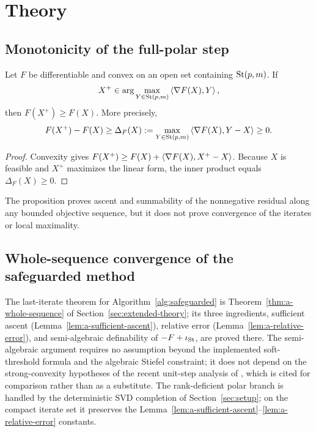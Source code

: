 \section{Theory}
\label{sec:theory}



\subsection{Monotonicity of the full-polar step}
\begin{proposition}
\label{prop:fullpolar-monotone}
Let \(F\) be differentiable and convex on an open set containing \(\mathrm{St}(p,m)\). If
\[
X^+\in\arg\max_{Y\in\mathrm{St}(p,m)}\left\langle \nabla F(X),Y\right\rangle,
\]
then \(F(X^+)\ge F(X)\). More precisely,
\[
F(X^+)-F(X)\ge \Delta_F(X):=
\max_{Y\in\mathrm{St}(p,m)}\left\langle \nabla F(X),Y-X\right\rangle\ge0.
\]
\end{proposition}
\begin{proof}
Convexity gives \(F(X^+)\ge F(X)+\left\langle \nabla F(X),X^+-X\right\rangle\). Because \(X\) is feasible and \(X^+\) maximizes the linear form, the inner product equals \(\Delta_F(X)\ge0\).
\end{proof}
The proposition proves ascent and summability of the nonnegative residual along any bounded objective sequence, but it does not prove convergence of the iterates or local maximality.

\subsection{Whole-sequence convergence of the safeguarded method}
The last-iterate theorem for Algorithm~\ref{alg:safeguarded} is Theorem~\ref{thm:a-whole-sequence} of Section~\ref{sec:extended-theory}; its three ingredients, sufficient ascent (Lemma~\ref{lem:a-sufficient-ascent}), relative error (Lemma~\ref{lem:a-relative-error}), and semi-algebraic definability of $-F+\iota_{\mathrm{St}}$, are proved there. The semi-algebraic argument requires no assumption beyond the implemented soft-threshold formula and the algebraic Stiefel constraint; it does not depend on the strong-convexity hypotheses of the recent unit-step analysis of \citet{aktas2025strongly}, which is cited for comparison rather than as a substitute. The rank-deficient polar branch is handled by the deterministic SVD completion of Section~\ref{sec:setup}; on the compact iterate set it preserves the Lemma~\ref{lem:a-sufficient-ascent}--\ref{lem:a-relative-error} constants.

